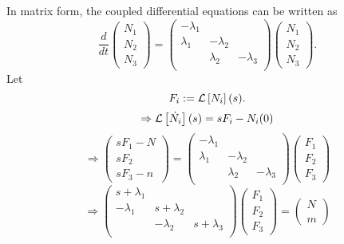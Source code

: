 \item

In matrix form, the coupled differential equations can be written as
\[
    \frac{d}{dt} \begin{pmatrix} N_1 \\ N_2 \\ N_3 \end{pmatrix}
    = \begin{pmatrix}
        -\lambda_1 &            &            \\
         \lambda_1 & -\lambda_2 &            \\
                   &  \lambda_2 & -\lambda_3 \\
    \end{pmatrix}
    \begin{pmatrix} N_1 \\ N_2 \\ N_3 \end{pmatrix}.
\]
Let
\[
    F_i := \mathcal{L}\left[ N_i \right](s).
\]
\[
    \Rightarrow \mathcal{L}\left[ \dot{N_i} \right](s)
    = sF_i - N_i(0)
\]
\[
    \Rightarrow \begin{pmatrix} sF_1 - N \\ sF_2 \\ sF_3 - n \end{pmatrix}
    = \begin{pmatrix}
        -\lambda_1 &            &            \\
         \lambda_1 & -\lambda_2 &            \\
                   &  \lambda_2 & -\lambda_3 \\
    \end{pmatrix}
    \begin{pmatrix} F_1 \\ F_2 \\ F_3 \end{pmatrix}
\]
\[
    \Rightarrow \begin{pmatrix}
        s + \lambda_1 &               &               \\
           -\lambda_1 & s + \lambda_2 &               \\
                      &    -\lambda_2 & s + \lambda_3 \\
    \end{pmatrix}
    \begin{pmatrix} F_1 \\ F_2 \\ F_3 \end{pmatrix}
    = \begin{pmatrix} N \\ \\ m \end{pmatrix}
\]
